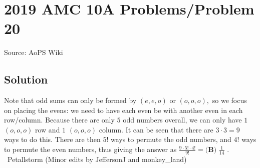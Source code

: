 \documentclass[12pt]{article}
\begin{document}
\section*{{2019 AMC 10A Problems/Problem 20}}
Source: AoPS Wiki

\subsection*{Solution}
Note that odd sums can only be formed by $(e,e,o)$ or $(o,o,o),$ so we focus on placing the evens: we need to have each even be with another even in each row/column. Because there are only $5$ odd numbers overall, we can only have $1$ $(o,o,o)$ row and $1$ $(o,o,o)$ column. It can be seen that there are $3 \cdot 3 = 9$ ways to do this. There are then $5!$ ways to permute the odd numbers, and $4!$ ways to permute the even numbers, thus giving the answer as $\frac{9 \cdot 5! \cdot 4!}{9!}=\boxed{\textbf{(B) }\frac{1}{14}}$ . ~Petallstorm
(Minor edits by JeffersonJ and monkey_land)
\end{document}
